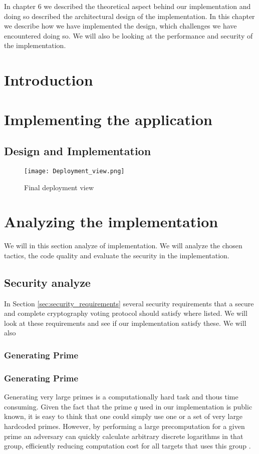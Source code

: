 In chapter 6 we described the theoretical aspect behind our implementation and doing so described the architectural design of the implementation. In this chapter we describe how we have implemented the design, which challenges we have encountered doing so. We will also be looking at the performance and security of the implementation.


\section{Introduction}




\section{Implementing the application}



\subsection{Design and Implementation}

\begin{figure}[H]
    \centering
    \texttt{[image: Deployment\_view.png]}
    \caption{Final deployment view}
\end{figure}




\section{Analyzing the implementation}
We will in this section analyze of implementation. We will analyze the chosen tactics, the code quality and evaluate the security in the implementation. 

\subsection{Security analyze}
In Section \ref{sec:security_requirements} several security requirements that a secure 
and complete cryptography voting protocol should satisfy where listed. We will look at
these requirements and see if our implementation satisfy these. We will also 


\subsubsection{Generating Prime}

\subsubsection{Generating Prime}
Generating very large primes is a computationally hard task and thous time consuming. Given the fact
that the prime $q$ used in our implementation is public known, it is easy to think that one could simply
use one or a set of very large hardcoded primes. However, by performing a large precomputation for a given
prime an adversary can quickly calculate arbitrary discrete logarithms in that group, efficiently reducing 
computation cost for all targets that uses this group \cite{Adrian:2015:IFS:2810103.2813707}. 



